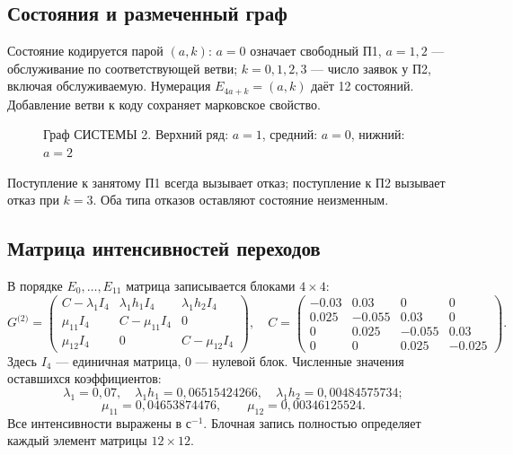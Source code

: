 \documentclass[11pt,a4paper]{article}
\newcommand{\sII}{\text{(2)}}
\newcommand{\secs}{\text{с}}
\begin{document}
\subsection{Состояния и размеченный граф}
Состояние кодируется парой $(a,k)$: $a=0$ означает свободный П1, $a=1,2$ --- обслуживание по соответствующей ветви; $k=0,1,2,3$ --- число заявок у П2, включая обслуживаемую. Нумерация $E_{4a+k}=(a,k)$ даёт 12 состояний. Добавление ветви к коду сохраняет марковское свойство.

\begin{figure}[H]\centering
{}
\caption{Граф СИСТЕМЫ 2. Верхний ряд: $a=1$, средний: $a=0$, нижний: $a=2$}
\end{figure}
Поступление к занятому П1 всегда вызывает отказ; поступление к П2 вызывает отказ при $k=3$. Оба типа отказов оставляют состояние неизменным.

\newpage
\subsection{Матрица интенсивностей переходов}
В порядке $E_0,\ldots,E_{11}$ матрица записывается блоками $4\times4$:
\begin{equation}
G^{\sII}=\begin{pmatrix}
C-\lambda_1I_4&\lambda_1h_1I_4&\lambda_1h_2I_4\\
\mu_{11}I_4&C-\mu_{11}I_4&0\\
\mu_{12}I_4&0&C-\mu_{12}I_4
\end{pmatrix},\quad
C=\begin{pmatrix}
-0.03&0.03&0&0\\
0.025&-0.055&0.03&0\\
0&0.025&-0.055&0.03\\
0&0&0.025&-0.025
\end{pmatrix}.
\end{equation}
Здесь $I_4$ --- единичная матрица, $0$ --- нулевой блок. Численные значения оставшихся коэффициентов:
\[
\lambda_1=0{,}07,\quad \lambda_1h_1=0{,}06515424266,\quad
\lambda_1h_2=0{,}00484575734;
\]
\[
\mu_{11}=0{,}04653874476,\qquad \mu_{12}=0{,}00346125524.
\]
Все интенсивности выражены в $\secs^{-1}$. Блочная запись полностью определяет каждый элемент матрицы $12\times12$.
\end{document}

